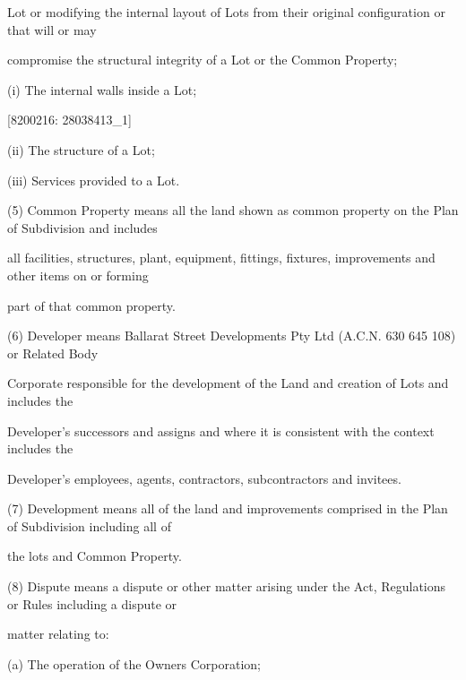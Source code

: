 \documentclass{article}
\begin{document}
{\fontsize{10.02}{1}Lot or modifying the internal layout of Lots from their original configuration or that will or may }

{\fontsize{10.02}{1}compromise the structural integrity of a Lot or the Common Property; }

{\fontsize{9.962}{1}(i) The internal walls inside a Lot; }

\newpage
















{\fontsize{7.02}{1}[8200216: 28038413\_1] }

{\fontsize{9.962}{1}(ii) The structure of a Lot; }

{\fontsize{9.962}{1}(iii) Services provided to a Lot. }


{\fontsize{9.962}{1}(5) Common Property means all the land shown as common property on the Plan of Subdivision and includes }

{\fontsize{10.02}{1}all facilities, structures, plant, equipment, fittings, fixtures, improvements and other items on or forming }

{\fontsize{10.02}{1}part of that common property. }

{\fontsize{9.962}{1}(6) Developer means Ballarat Street Developments Pty Ltd (A.C.N. 630 645 108) or Related Body }

{\fontsize{10.02}{1}Corporate responsible for the development of the Land and creation of Lots and includes the }

{\fontsize{10.02}{1}Developer’s successors and assigns and where it is consistent with the context includes the }

{\fontsize{10.02}{1}Developer’s employees, agents, contractors, subcontractors and invitees. }

{\fontsize{9.962}{1}(7) Development means all of the land and improvements comprised in the Plan of Subdivision including all of }

{\fontsize{10.02}{1}the lots and Common Property. }

{\fontsize{9.962}{1}(8) Dispute means a dispute or other matter arising under the Act, Regulations or Rules including a dispute or }

{\fontsize{10.02}{1}matter relating to: }

{\fontsize{9.962}{1}(a) The operation of the Owners Corporation; }
\end{document}
